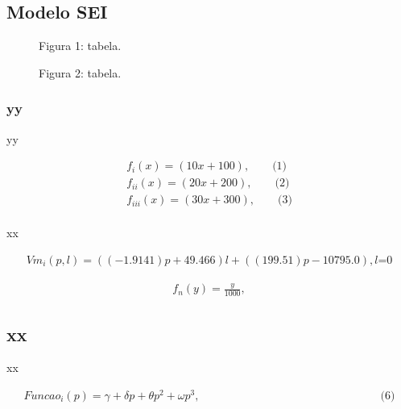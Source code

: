 \documentclass[12pt]{article}
\begin{document}
\subsection{Modelo SEI}

\newpage
\begin{figure}[H]
\centering
\begin{center}
Figura 1: tabela.
\end{center}
\end{figure}

\begin{figure}[H]
\centering
\begin{center}
Figura 2: tabela.
\end{center}
\end{figure}

\newpage
\subsubsection{yy}

yy

\begin{align*}
f_{i}(x) = (10x + 100), \qquad \text{(1)} \tag{1}\\
f_{ii}(x) = (20x + 200), \qquad \text{(2)} \tag{2} \\
f_{iii}(x) = (30x + 300), \qquad \text{(3)} \tag{3} \\
\end{align*} %

xx

\begin{align*}
Vm_{i}(p,l) = ((-1.9141)p + 49.466)l + ((199.51)p - 10795.0), \text {$l$=0} \tag{4}
\end{align*}

\begin{align*}
f_{n}(y) = \frac{y}{1000}, \tag{5}
\end{align*}

\subsection{xx}

xx

\begin{align*} 
Funcao_{i}(p) = \gamma + \delta p + \theta p^2 + \omega p^3, \qquad \qquad \qquad \qquad \qquad \qquad \qquad \qquad \text{(6)} \tag{6} \\
\end{align*} %
\end{document}

